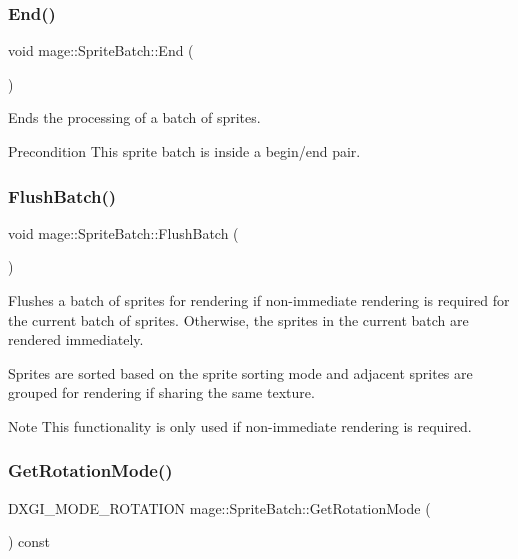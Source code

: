 \subsubsection{\texorpdfstring{End()}{End()}}
{\footnotesize\ttfamily void mage\+::\+Sprite\+Batch\+::\+End (\begin{DoxyParamCaption}{ }\end{DoxyParamCaption})}

Ends the processing of a batch of sprites.

\begin{DoxyPrecond}{Precondition}
This sprite batch is inside a begin/end pair. 
\end{DoxyPrecond}
\hypertarget{classmage_1_1_sprite_batch_a352714b5d02590245ab8ffe8489305f7}{}\label{classmage_1_1_sprite_batch_a352714b5d02590245ab8ffe8489305f7} 
\subsubsection{\texorpdfstring{Flush\+Batch()}{FlushBatch()}}
{\footnotesize\ttfamily void mage\+::\+Sprite\+Batch\+::\+Flush\+Batch (\begin{DoxyParamCaption}{ }\end{DoxyParamCaption})\hspace{0.3cm}{\ttfamily [private]}}

Flushes a batch of sprites for rendering if non-\/immediate rendering is required for the current batch of sprites. Otherwise, the sprites in the current batch are rendered immediately.

Sprites are sorted based on the sprite sorting mode and adjacent sprites are grouped for rendering if sharing the same texture.

\begin{DoxyNote}{Note}
This functionality is only used if non-\/immediate rendering is required. 
\end{DoxyNote}
\hypertarget{classmage_1_1_sprite_batch_ae38132bcf084f268dae7bfcc3b9c9a4d}{}\label{classmage_1_1_sprite_batch_ae38132bcf084f268dae7bfcc3b9c9a4d} 
\subsubsection{\texorpdfstring{Get\+Rotation\+Mode()}{GetRotationMode()}}
{\footnotesize\ttfamily D\+X\+G\+I\+\_\+\+M\+O\+D\+E\+\_\+\+R\+O\+T\+A\+T\+I\+ON mage\+::\+Sprite\+Batch\+::\+Get\+Rotation\+Mode (\begin{DoxyParamCaption}{ }\end{DoxyParamCaption}) const\hspace{0.3cm}{\ttfamily [noexcept]}}

